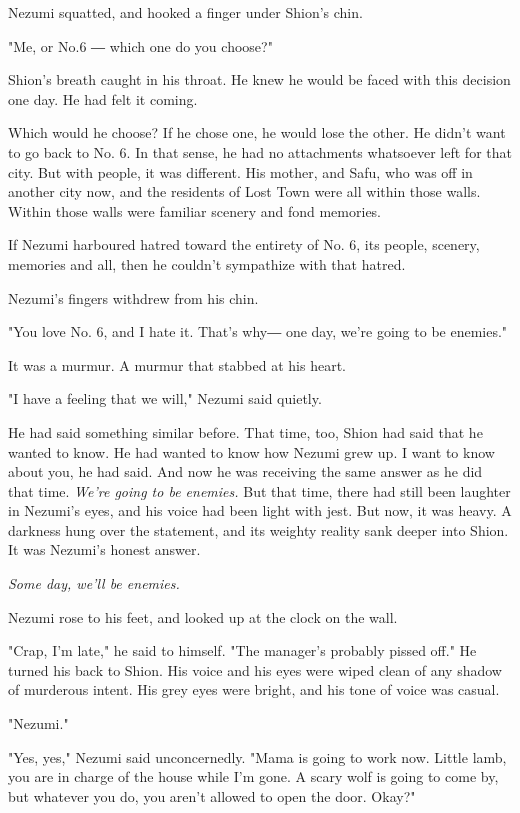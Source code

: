 Nezumi squatted, and hooked a finger under Shion's chin.

"Me, or No.6 ― which one do you choose?"

Shion's breath caught in his throat. He knew he would be faced with this
decision one day. He had felt it coming.

Which would he choose? If he chose one, he would lose the other. He
didn't want to go back to No. 6. In that sense, he had no attachments
whatsoever left for that city. But with people, it was different. His
mother, and Safu, who was off in another city now, and the residents of
Lost Town were all within those walls. Within those walls were familiar
scenery and fond memories.

If Nezumi harboured hatred toward the entirety of No. 6, its people,
scenery, memories and all, then he couldn't sympathize with that hatred.

Nezumi's fingers withdrew from his chin.

"You love No. 6, and I hate it. That's why― one day, we're going to be
enemies."

It was a murmur. A murmur that stabbed at his heart.

"I have a feeling that we will," Nezumi said quietly.

He had said something similar before. That time, too, Shion had said
that he wanted to know. He had wanted to know how Nezumi grew up. I want
to know about you, he had said. And now he was receiving the same answer
as he did that time. \emph{We're going to be enemies.} But that time, there had
still been laughter in Nezumi's eyes, and his voice had been light with
jest. But now, it was heavy. A darkness hung over the statement, and its
weighty reality sank deeper into Shion. It was Nezumi's honest answer.

\emph{Some day, we'll be enemies.}

Nezumi rose to his feet, and looked up at the clock on the wall.

"Crap, I'm late," he said to himself. "The manager's probably pissed
off." He turned his back to Shion. His voice and his eyes were wiped
clean of any shadow of murderous intent. His grey eyes were bright, and
his tone of voice was casual.

"Nezumi."

"Yes, yes," Nezumi said unconcernedly. "Mama is going to work now.
Little lamb, you are in charge of the house while I'm gone. A scary wolf
is going to come by, but whatever you do, you aren't allowed to open the
door. Okay?"

